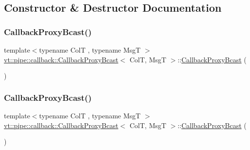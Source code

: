 \subsection{Constructor \& Destructor Documentation}
\mbox{\label{structvt_1_1pipe_1_1callback_1_1_callback_proxy_bcast_a0f65df639ce4c3a9760b50107defbcad}} 
\subsubsection{\texorpdfstring{Callback\+Proxy\+Bcast()}{CallbackProxyBcast()}\hspace{0.1cm}{\footnotesize\ttfamily [1/4]}}
{\footnotesize\ttfamily template$<$typename ColT , typename MsgT $>$ \\
\hyperlink{structvt_1_1pipe_1_1callback_1_1_callback_proxy_bcast}{vt\+::pipe\+::callback\+::\+Callback\+Proxy\+Bcast}$<$ ColT, MsgT $>$\+::\hyperlink{structvt_1_1pipe_1_1callback_1_1_callback_proxy_bcast}{Callback\+Proxy\+Bcast} (\begin{DoxyParamCaption}{ }\end{DoxyParamCaption})\hspace{0.3cm}{\ttfamily [default]}}

\mbox{\label{structvt_1_1pipe_1_1callback_1_1_callback_proxy_bcast_a196de6268c374af67345657d9cb2a8d4}} 
\subsubsection{\texorpdfstring{Callback\+Proxy\+Bcast()}{CallbackProxyBcast()}\hspace{0.1cm}{\footnotesize\ttfamily [2/4]}}
{\footnotesize\ttfamily template$<$typename ColT , typename MsgT $>$ \\
\hyperlink{structvt_1_1pipe_1_1callback_1_1_callback_proxy_bcast}{vt\+::pipe\+::callback\+::\+Callback\+Proxy\+Bcast}$<$ ColT, MsgT $>$\+::\hyperlink{structvt_1_1pipe_1_1callback_1_1_callback_proxy_bcast}{Callback\+Proxy\+Bcast} (\begin{DoxyParamCaption}\item[{\hyperlink{structvt_1_1pipe_1_1callback_1_1_callback_proxy_bcast}{Callback\+Proxy\+Bcast}$<$ ColT, MsgT $>$ const \&}]{ }\end{DoxyParamCaption})\hspace{0.3cm}{\ttfamily [default]}}

